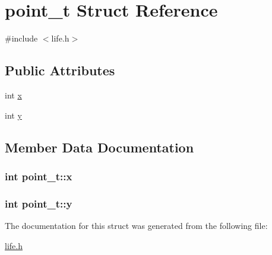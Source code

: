 \hypertarget{structpoint__t}{}\section{point\+\_\+t Struct Reference}
\label{structpoint__t}


{\ttfamily \#include $<$life.\+h$>$}

\subsection*{Public Attributes}
\begin{DoxyCompactItemize}
\item 
int \hyperlink{structpoint__t_a8c2e3bf26d194ce8ffdf84bb501602d4}{x}
\item 
int \hyperlink{structpoint__t_ad320c37ee9949e4874a505483d2f6907}{y}
\end{DoxyCompactItemize}


\subsection{Member Data Documentation}
\subsubsection[{\texorpdfstring{x}{x}}]{\setlength{\rightskip}{0pt plus 5cm}int point\+\_\+t\+::x}\hypertarget{structpoint__t_a8c2e3bf26d194ce8ffdf84bb501602d4}{}\label{structpoint__t_a8c2e3bf26d194ce8ffdf84bb501602d4}
\subsubsection[{\texorpdfstring{y}{y}}]{\setlength{\rightskip}{0pt plus 5cm}int point\+\_\+t\+::y}\hypertarget{structpoint__t_ad320c37ee9949e4874a505483d2f6907}{}\label{structpoint__t_ad320c37ee9949e4874a505483d2f6907}


The documentation for this struct was generated from the following file\+:\begin{DoxyCompactItemize}
\item 
\hyperlink{life_8h}{life.\+h}\end{DoxyCompactItemize}
